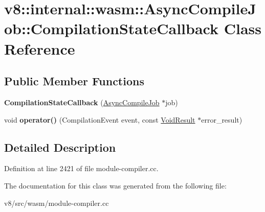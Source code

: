 \hypertarget{classv8_1_1internal_1_1wasm_1_1AsyncCompileJob_1_1CompilationStateCallback}{}\section{v8\+:\+:internal\+:\+:wasm\+:\+:Async\+Compile\+Job\+:\+:Compilation\+State\+Callback Class Reference}
\label{classv8_1_1internal_1_1wasm_1_1AsyncCompileJob_1_1CompilationStateCallback}
\subsection*{Public Member Functions}
\begin{DoxyCompactItemize}
\item 
\mbox{\label{classv8_1_1internal_1_1wasm_1_1AsyncCompileJob_1_1CompilationStateCallback_a78a39f3673bf5ded7f231a9201b16fa0}} 
{\bfseries Compilation\+State\+Callback} (\mbox{\hyperlink{classv8_1_1internal_1_1wasm_1_1AsyncCompileJob}{Async\+Compile\+Job}} $\ast$job)
\item 
\mbox{\label{classv8_1_1internal_1_1wasm_1_1AsyncCompileJob_1_1CompilationStateCallback_a8ef73c13fbe77e247a29fa47c2d27bf9}} 
void {\bfseries operator()} (Compilation\+Event event, const \mbox{\hyperlink{classv8_1_1internal_1_1wasm_1_1Result}{Void\+Result}} $\ast$error\+\_\+result)
\end{DoxyCompactItemize}


\subsection{Detailed Description}


Definition at line 2421 of file module-\/compiler.\+cc.



The documentation for this class was generated from the following file\+:\begin{DoxyCompactItemize}
\item 
v8/src/wasm/module-\/compiler.\+cc\end{DoxyCompactItemize}
